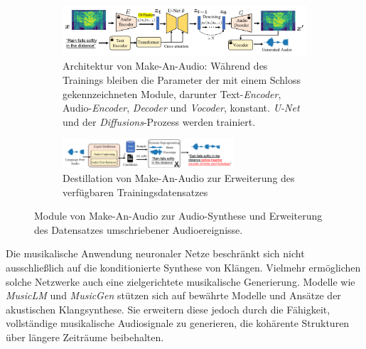\documentclass[
  a4paper,  %
  twoside,  %
  bibliography=totoc,
  headsepline,
  cleardoublepage=empty,
  parskip=half,
  draft=false
]{scrbook}
\begin{document}
\begin{figure}[h]
\centering
\begin{subfigure}{1.0\textwidth}
  \centering
  \includegraphics[width=1\textwidth]{graphics/Make-An_Audio.png}
  \caption[Make-An-Audio Architektur]{Architektur von Make-An-Audio: Während des Trainings bleiben die Parameter der mit einem Schloss gekennzeichneten Module, darunter Text-\emph{Encoder}, Audio-\emph{Encoder}, \emph{Decoder} und \emph{Vocoder}, konstant. \emph{U-Net} und der \emph{Diffusions}-Prozess werden trainiert. \cite{huang_make--audio_2023}}
  \label{fig:Make-An-Audio_Architecture}
\end{subfigure}

\vspace{1em} %

\begin{subfigure}{1.0\textwidth}
  \centering
  \includegraphics[width=0.7\textwidth]{graphics/Make-An-Audio-Destillation.png}
  \caption[Make-An-Audio Destillation]{Destillation von Make-An-Audio zur Erweiterung des verfügbaren Trainingsdatensatzes \cite{huang_make--audio_2023}}
  \label{fig:Make-An-Audio_DestillATIon}
\end{subfigure}
\caption[Make-An-Audio Module]{Module von Make-An-Audio zur Audio-Synthese und Erweiterung des Datensatzes umschriebener Audioereignisse. \cite{huang_make--audio_2023}}
\label{fig:test}
\end{figure}

Die musikalische Anwendung neuronaler Netze beschränkt sich nicht ausschließlich auf die konditionierte Synthese von Klängen. Vielmehr ermöglichen solche Netzwerke auch eine zielgerichtete musikalische Generierung. Modelle wie \emph{MusicLM} \cite{agostinelli_musiclm_2023} und \emph{MusicGen} \cite{copet_simple_2023} stützen sich auf bewährte Modelle und Ansätze der akustischen Klangsynthese. Sie erweitern diese jedoch durch die Fähigkeit, vollständige musikalische Audiosignale zu generieren, die kohärente Strukturen über längere Zeiträume beibehalten. 
\end{document}
